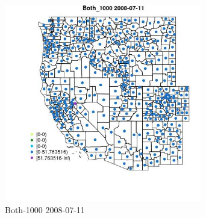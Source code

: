 \begin{figure} 
\centering  
\includegraphics[width=0.77\textwidth]{Code_Outputs/df_report_ML_predictors_CountyCentroid_Locations_Dates_2008-01-01to2018-12-31_MapObsBoth_10002008-07-11.jpg} 
\caption{\label{fig:df_report_ML_predictors_CountyCentroid_Locations_Dates_2008-01-01to2018-12-31MapObsBoth_10002008-07-11}Both-1000 2008-07-11} 
\end{figure} 
 
